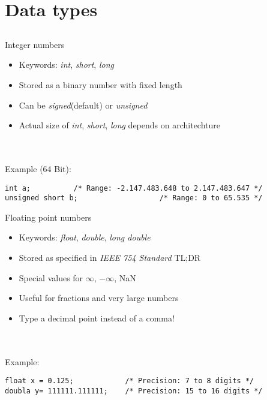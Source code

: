 \section{Data types}
\subsection{}
\begin{frame}[fragile]{Integer numbers}
	\begin{itemize}
		\item Keywords: \textit{int}, \textit{short}, \textit{long}
		\item Stored as a binary number with fixed length
		\item Can be \textit{signed}(default) or \textit{unsigned} 
		\item Actual size of \textit{int}, \textit{short}, \textit{long} depends on architechture
	\end{itemize}\ \\
	\ \\
	Example (64 Bit):
	\begin{lstlisting}[numbers=none]
int a;			/* Range: -2.147.483.648 to 2.147.483.647 */
unsigned short b;					/* Range: 0 to 65.535 */
\end{lstlisting}
\end{frame}
\begin{frame}[fragile]{Floating point numbers}
	\begin{itemize}
		\item Keywords: \textit{float}, \textit{double}, \textit{long double}
		\item Stored as specified in \textit{IEEE 754 Standard} TL;DR
		\item Special values for $\infty$, $-\infty$, NaN
		\item Useful for fractions and very large numbers
		\item Type a decimal point instead of a comma!
	\end{itemize}\ \\
	\ \\
	Example:
	\begin{lstlisting}[numbers=none]
float x = 0.125;			/* Precision: 7 to 8 digits */
doubla y= 111111.111111;	/* Precision: 15 to 16 digits */
\end{lstlisting}
\end{frame}
